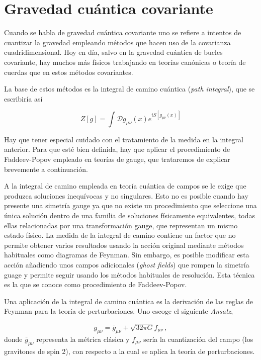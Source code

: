 \documentclass[11pt,a4paper,titlepage]{article}
\begin{document}
\section{Gravedad cuántica covariante}

Cuando se habla de gravedad cuántica covariante uno se refiere a intentos de cuantizar la gravedad empleando métodos que hacen uso de la covarianza cuadridimensional. Hoy en día, salvo en la gravedad cuántica de bucles covariante, hay muchos más físicos trabajando en teorías canónicas o teoría de cuerdas que en estos métodos covariantes.

La base de estos métodos es la integral de camino cuántica (\textit{path integral}), que se escribiría así

\begin{equation*}
 Z[g]=\int\mathscr{D}g_{\mu\nu}(x)e^{iS[g_{\mu\nu}(x)]}
\end{equation*}

Hay que tener especial cuidado con el tratamiento de la medida en la integral anterior. Para que esté bien definida, hay que aplicar el procedimiento de Faddeev-Popov \cite{popov} empleado en teorías de gauge, que trataremos de explicar brevemente a continuación.

A la integral de camino empleada en teoría cuántica de campos se le exige que produzca soluciones inequívocas y no singulares. Esto no es posible cuando hay presente una simetría gauge ya que no existe un procedimiento que seleccione una única solución dentro de una familia de soluciones físicamente equivalentes, todas ellas relacionadas por una transformación gauge, que representan un mismo estado físico. La medida de la integral de camino contiene un factor que no permite obtener varios resultados usando la acción original mediante métodos habituales como diagramas de Feynman. Sin embargo, es posible modificar esta acción añadiendo unos campos adicionales (\emph{ghost fields}) que rompen la simetría guage y permite seguir usando los métodos habituales de resolución. Esta técnica es la que se conoce como procedimiento de Faddeev-Popov.

Una aplicación de la integral de camino cuántica es la derivación de las reglas de Feynman para la teoría de perturbaciones. Uno escoge el siguiente \emph{Ansatz},

\begin{equation*}
 g_{\mu\nu}=\bar{g}_{\mu\nu}+\sqrt{32\pi G}f_{\mu\nu}\,,
\end{equation*}
donde $\bar{g}_{\mu\nu}$ representa la métrica clásica y $f_{\mu\nu}$ sería la cuantización del campo (los gravitones de spin 2), con respecto a la cual se aplica la teoría de perturbaciones.
\end{document}
